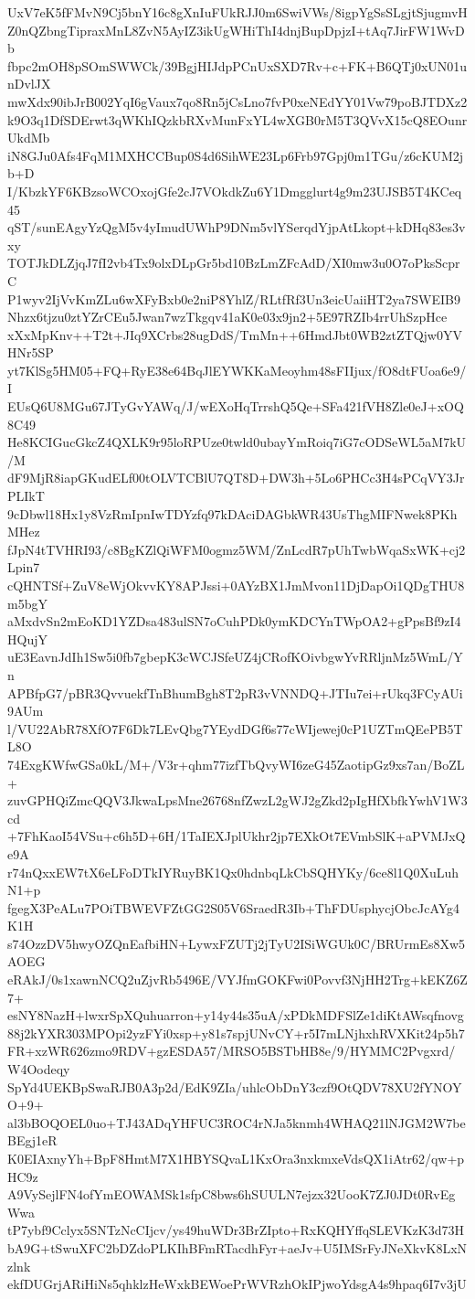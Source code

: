 UxV7eK5fFMvN9Cj5bnY16c8gXnIuFUkRJJ0m6SwiVWs/8igpYgSsSLgjtSjugmvH
Z0nQZbngTipraxMnL8ZvN5AyIZ3ikUgWHiThI4dnjBupDpjzI+tAq7JirFW1WvDb
fbpc2mOH8pSOmSWWCk/39BgjHIJdpPCnUxSXD7Rv+c+FK+B6QTj0xUN01unDvlJX
mwXdx90ibJrB002YqI6gVaux7qo8Rn5jCsLno7fvP0xeNEdYY01Vw79poBJTDXz2
k9O3q1DfSDErwt3qWKhIQzkbRXvMunFxYL4wXGB0rM5T3QVvX15cQ8EOunrUkdMb
iN8GJu0Afs4FqM1MXHCCBup0S4d6SihWE23Lp6Frb97Gpj0m1TGu/z6cKUM2jb+D
I/KbzkYF6KBzsoWCOxojGfe2cJ7VOkdkZu6Y1Dmgglurt4g9m23UJSB5T4KCeq45
qST/sunEAgyYzQgM5v4yImudUWhP9DNm5vlYSerqdYjpAtLkopt+kDHq83es3vxy
TOTJkDLZjqJ7fI2vb4Tx9olxDLpGr5bd10BzLmZFcAdD/XI0mw3u0O7oPksScprC
P1wyv2IjVvKmZLu6wXFyBxb0e2niP8YhlZ/RLtfRf3Un3eicUaiiHT2ya7SWEIB9
Nhzx6tjzu0ztYZrCEu5Jwan7wzTkgqv41aK0e03x9jn2+5E97RZIb4rrUhSzpHce
xXxMpKnv++T2t+JIq9XCrbs28ugDdS/TmMn++6HmdJbt0WB2ztZTQjw0YVHNr5SP
yt7KlSg5HM05+FQ+RyE38e64BqJlEYWKKaMeoyhm48sFIIjux/fO8dtFUoa6e9/I
EUsQ6U8MGu67JTyGvYAWq/J/wEXoHqTrrshQ5Qe+SFa421fVH8Zle0eJ+xOQ8C49
He8KCIGucGkcZ4QXLK9r95loRPUze0twld0ubayYmRoiq7iG7cODSeWL5aM7kU/M
dF9MjR8iapGKudELf00tOLVTCBlU7QT8D+DW3h+5Lo6PHCc3H4sPCqVY3JrPLIkT
9cDbwl18Hx1y8VzRmIpnIwTDYzfq97kDAciDAGbkWR43UsThgMIFNwek8PKhMHez
fJpN4tTVHRI93/c8BgKZlQiWFM0ogmz5WM/ZnLcdR7pUhTwbWqaSxWK+cj2Lpin7
cQHNTSf+ZuV8eWjOkvvKY8APJssi+0AYzBX1JmMvon11DjDapOi1QDgTHU8m5bgY
aMxdvSn2mEoKD1YZDsa483ulSN7oCuhPDk0ymKDCYnTWpOA2+gPpsBf9zI4HQujY
uE3EavnJdIh1Sw5i0fb7gbepK3cWCJSfeUZ4jCRofKOivbgwYvRRljnMz5WmL/Yn
APBfpG7/pBR3QvvuekfTnBhumBgh8T2pR3vVNNDQ+JTIu7ei+rUkq3FCyAUi9AUm
l/VU22AbR78XfO7F6Dk7LEvQbg7YEydDGf6s77cWIjewej0cP1UZTmQEePB5TL8O
74ExgKWfwGSa0kL/M+/V3r+qhm77izfTbQvyWI6zeG45ZaotipGz9xs7an/BoZL+
zuvGPHQiZmcQQV3JkwaLpsMne26768nfZwzL2gWJ2gZkd2pIgHfXbfkYwhV1W3cd
+7FhKaoI54VSu+c6h5D+6H/1TaIEXJplUkhr2jp7EXkOt7EVmbSlK+aPVMJxQe9A
r74nQxxEW7tX6eLFoDTkIYRuyBK1Qx0hdnbqLkCbSQHYKy/6ce8l1Q0XuLuhN1+p
fgegX3PeALu7POiTBWEVFZtGG2S05V6SraedR3Ib+ThFDUsphycjObcJcAYg4K1H
s74OzzDV5hwyOZQnEafbiHN+LywxFZUTj2jTyU2ISiWGUk0C/BRUrmEs8Xw5AOEG
eRAkJ/0s1xawnNCQ2uZjvRb5496E/VYJfmGOKFwi0Povvf3NjHH2Trg+kEKZ6Z7+
esNY8NazH+lwxrSpXQuhuarron+y14y44s35uA/xPDkMDFSlZe1diKtAWsqfnovg
88j2kYXR303MPOpi2yzFYi0xsp+y81s7spjUNvCY+r5I7mLNjhxhRVXKit24p5h7
FR+xzWR626zmo9RDV+gzESDA57/MRSO5BSTbHB8e/9/HYMMC2Pvgxrd/W4Oodeqy
SpYd4UEKBpSwaRJB0A3p2d/EdK9ZIa/uhlcObDnY3czf9OtQDV78XU2fYNOYO+9+
al3bBOQOEL0uo+TJ43ADqYHFUC3ROC4rNJa5knmh4WHAQ21lNJGM2W7beBEgj1eR
K0EIAxnyYh+BpF8HmtM7X1HBYSQvaL1KxOra3nxkmxeVdsQX1iAtr62/qw+pHC9z
A9VySejlFN4ofYmEOWAMSk1sfpC8bws6hSUULN7ejzx32UooK7ZJ0JDt0RvEgWwa
tP7ybf9Cclyx5SNTzNcCIjcv/ys49huWDr3BrZIpto+RxKQHYffqSLEVKzK3d73H
bA9G+tSwuXFC2bDZdoPLKIhBFmRTacdhFyr+aeJv+U5IMSrFyJNeXkvK8LxNzlnk
ekfDUGrjARiHiNs5qhklzHeWxkBEWoePrWVRzhOkIPjwoYdsgA4s9hpaq6I7v3jU
